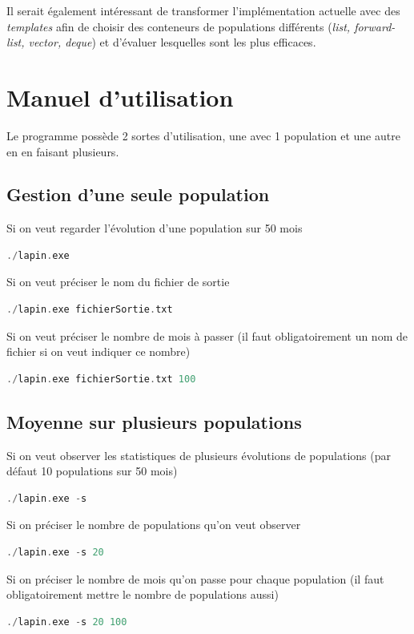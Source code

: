 \documentclass{article}
\begin{document}
Il serait également intéressant de transformer l'implémentation actuelle avec des \emph{templates}
afin de choisir des conteneurs de populations différents (\emph{list, forward-list, vector, deque})
et d'évaluer lesquelles sont les plus efficaces.



\newpage
\appendix
\section{Manuel d'utilisation}
Le programme possède 2 sortes d'utilisation, une avec 1 population et une autre en en faisant plusieurs.

\subsection{Gestion d'une seule population}
Si on veut regarder l'évolution d'une population sur 50 mois
\begin{lstlisting}[language=c++]
  ./lapin.exe
\end{lstlisting}
Si on veut préciser le nom du fichier de sortie
\begin{lstlisting}[language=c++]
  ./lapin.exe fichierSortie.txt
\end{lstlisting}
Si on veut préciser le nombre de mois à passer (il faut obligatoirement un nom de fichier si on veut indiquer ce nombre)
\begin{lstlisting}[language=c++]
  ./lapin.exe fichierSortie.txt 100
\end{lstlisting}

\subsection{Moyenne sur plusieurs populations}
Si on veut observer les statistiques de plusieurs évolutions de populations (par défaut 10 populations sur 50 mois)
\begin{lstlisting}[language=c++]
  ./lapin.exe -s
\end{lstlisting}
Si on préciser le nombre de populations qu'on veut observer
\begin{lstlisting}[language=c++]
  ./lapin.exe -s 20
\end{lstlisting}
Si on préciser le nombre de mois qu'on passe pour chaque population (il faut obligatoirement mettre le nombre de populations aussi)
\begin{lstlisting}[language=c++]
  ./lapin.exe -s 20 100
\end{lstlisting}
\end{document}
